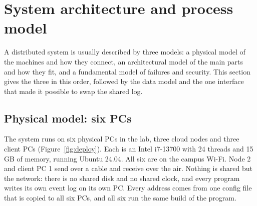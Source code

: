 \section{System architecture and process model}
\label{sec:arch}

A distributed system is usually described by three models: a physical model of the machines and how they connect, an architectural model of the main parts and how they fit, and a fundamental model of failures and security. This section gives the three in this order, followed by the data model and the one interface that made it possible to swap the shared log.

\subsection{Physical model: six PCs}
\label{sec:physical}

The system runs on six physical PCs in the lab, three cloud nodes and three client PCs (Figure~\ref{fig:deploy}). Each is an Intel i7-13700 with 24 threads and 15 GB of memory, running Ubuntu 24.04. All six are on the campus Wi-Fi. Node 2 and client PC 1 send over a cable and receive over the air. Nothing is shared but the network: there is no shared disk and no shared clock, and every program writes its own event log on its own PC. Every address comes from one config file that is copied to all six PCs, and all six run the same build of the program.

